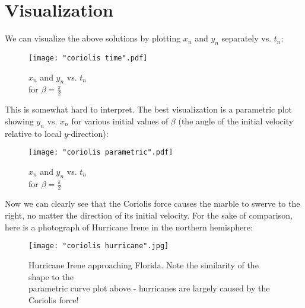 \documentclass{article}
\begin{document}
\section{Visualization}

We can visualize the above solutions by plotting $x_n$ and $y_n$ separately vs. $t_n$:
\begin{figure}[H]
	\centering
    \texttt{[image: "coriolis time".pdf]}
    \caption{$x_n$ and $y_n$ vs. $t_n$\\for $\beta = \frac{\pi}{2}$}\label{Fig:timePlot}
\end{figure}

This is somewhat hard to interpret. The best visualization is a parametric plot showing $y_n$ vs. $x_n$ for various initial values of $\beta$ (the angle of the initial velocity relative to local $y$-direction):

\begin{figure}[H]
    \centering
    \texttt{[image: "coriolis parametric".pdf]}
    \caption{$x_n$ and $y_n$ vs. $t_n$\\for $\beta = \frac{\pi}{2}$}\label{Fig:parametricPlot}
\end{figure}

Now we can clearly see that the Coriolis force causes the marble to swerve to the right, no matter the direction of its initial velocity. For the sake of comparison, here is a photograph of Hurricane Irene in the northern hemisphere:

\begin{figure}[H]
	\centering
	\texttt{[image: "coriolis hurricane".jpg]}
	\caption{Hurricane Irene approaching Florida. Note the similarity of the shape to the \\parametric  curve plot above - hurricanes are largely caused by the Coriolis force!}\label{Fig:hurricane}
\end{figure}
\end{document}
